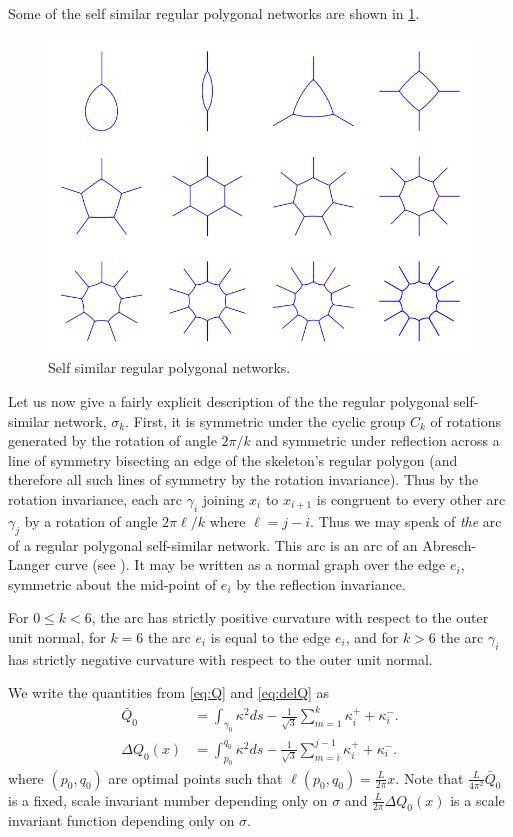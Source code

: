 \documentclass[11pt]{amsart}
\begin{document}
Some of the self similar regular polygonal networks are shown in \ref{fg:selfsimilarregularpolygon}.

\begin{figure}[htb]
\centering
\includegraphics[width=.9\linewidth]{selfsimilarregularpolygon}
\caption{Self similar regular polygonal networks.}
\label{fg:selfsimilarregularpolygon}
\end{figure}

Let us now give a fairly explicit description of the the regular polygonal self-similar network, \(\sigma_k\). First, it is symmetric under the cyclic group \(C_k\) of rotations generated by the rotation of angle \(2\pi/k\) and symmetric under reflection across a line of symmetry bisecting an edge of the skeleton's regular polygon (and therefore all such lines of symmetry by the rotation invariance). Thus by the rotation invariance, each arc \(\gamma_i\) joining \(x_i\) to \(x_{i+1}\) is congruent to every other arc \(\gamma_j\) by a rotation of angle \(2\pi \ell/k\) where \(\ell = j - i\). Thus we may speak of \emph{the} arc of a regular polygonal self-similar network. This arc is an arc of an Abresch-Langer curve (see \cite{MR845704,MR2931330}). It may be written as a normal graph over the edge \(e_i\), symmetric about the mid-point of \(e_i\) by the reflection invariance.

For \(0 \leq k < 6\), the arc has strictly positive curvature with respect to the outer unit normal, for \(k = 6\) the arc \(e_i\) is equal to the edge \(e_i\), and for \(k > 6\) the arc \(\gamma_i\) has strictly negative curvature with respect to the outer unit normal.

We write the quantities from \eqref{eq:Q} and \eqref{eq:delQ} as
\begin{align*}
\bar{Q}_0 &= \int_{\gamma_0} \kappa^2 ds - \frac{1}{\sqrt{3}} \sum_{m=1}^{k} \kappa_i^+ + \kappa_i^-.\\
\Delta Q_0 (x) &= \int_{p_0}^{q_0} \kappa^2 ds - \frac{1}{\sqrt{3}} \sum_{m=i}^{j-1} \kappa_i^+ + \kappa_i^-.
\end{align*}
where $(p_0, q_0)$ are optimal points such that $\ell(p_0, q_0) = \frac{L}{2\pi} x$. Note that $\tfrac{L}{4\pi^2} \bar{Q}_0$ is a fixed, scale invariant number depending only on $\sigma$ and $\tfrac{L}{2\pi} \Delta Q_0(x)$ is a scale invariant function depending only on $\sigma$.
\end{document}
